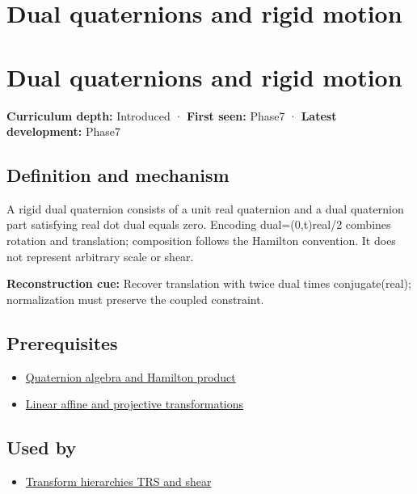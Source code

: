 \hypertarget{appendix-d1ea57347893}{}
\section*{Dual quaternions and rigid motion}
\section{Dual quaternions and rigid motion}\label{dual-quaternions-and-rigid-motion}

\textbf{Curriculum depth:} Introduced · \textbf{First seen:} Phase7 · \textbf{Latest development:} Phase7

\subsection{Definition and mechanism}\label{definition-and-mechanism}

A rigid dual quaternion consists of a unit real quaternion and a dual quaternion part satisfying real dot dual equals zero. Encoding dual=(0,t)real/2 combines rotation and translation; composition follows the Hamilton convention. It does not represent arbitrary scale or shear.

\textbf{Reconstruction cue:} Recover translation with twice dual times conjugate(real); normalization must preserve the coupled constraint.

\subsection{Prerequisites}\label{prerequisites}

\begin{itemize}
\tightlist
\item
  \hyperref[appendix-965d9260eeab]{Quaternion algebra and Hamilton product}
\item
  \hyperref[appendix-0bf0ca73f735]{Linear affine and projective transformations}
\end{itemize}

\subsection{Used by}\label{used-by}

\begin{itemize}
\tightlist
\item
  \hyperref[appendix-292c061cd47c]{Transform hierarchies TRS and shear}
\end{itemize}

